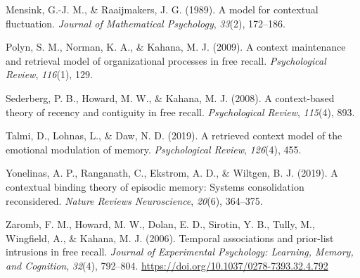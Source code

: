 \documentclass[
  man,
  floatsintext,
  longtable,
  nolmodern,
  notxfonts,
  notimes,
  draftfirst,
  colorlinks=true,linkcolor=blue,citecolor=blue,urlcolor=blue]{apa7}
\newlength{\cslhangindent}
\newenvironment{CSLReferences}[2] %
 {\begin{list}{}{%
  \setlength{\itemindent}{0pt}
  \setlength{\leftmargin}{0pt}
  \setlength{\parsep}{0pt}
  \ifodd #1
   \setlength{\leftmargin}{\cslhangindent}
   \setlength{\itemindent}{-1\cslhangindent}
  \fi
  \setlength{\itemsep}{#2\baselineskip}}}
 {\end{list}}
\begin{document}
\begin{CSLReferences}{1}{0}
Mensink, G.-J. M., \& Raaijmakers, J. G. (1989). A model for contextual
fluctuation. \emph{Journal of Mathematical Psychology}, \emph{33}(2),
172--186.

Polyn, S. M., Norman, K. A., \& Kahana, M. J. (2009). A context
maintenance and retrieval model of organizational processes in free
recall. \emph{Psychological Review}, \emph{116}(1), 129.

Sederberg, P. B., Howard, M. W., \& Kahana, M. J. (2008). A
context-based theory of recency and contiguity in free recall.
\emph{Psychological Review}, \emph{115}(4), 893.

Talmi, D., Lohnas, L., \& Daw, N. D. (2019). A retrieved context model
of the emotional modulation of memory. \emph{Psychological Review},
\emph{126}(4), 455.

Yonelinas, A. P., Ranganath, C., Ekstrom, A. D., \& Wiltgen, B. J.
(2019). A contextual binding theory of episodic memory: Systems
consolidation reconsidered. \emph{Nature Reviews Neuroscience},
\emph{20}(6), 364--375.

Zaromb, F. M., Howard, M. W., Dolan, E. D., Sirotin, Y. B., Tully, M.,
Wingfield, A., \& Kahana, M. J. (2006). Temporal associations and
prior-list intrusions in free recall. \emph{Journal of Experimental
Psychology: Learning, Memory, and Cognition}, \emph{32}(4), 792--804.
\url{https://doi.org/10.1037/0278-7393.32.4.792}

\end{CSLReferences}
\end{document}
